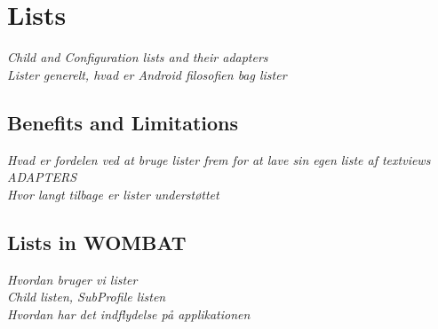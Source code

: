 \section{Lists}
\textit{Child and Configuration lists and their adapters\\
Lister generelt, hvad er Android filosofien bag lister}

\subsection{Benefits and Limitations}
\textit{ Hvad er fordelen ved at bruge lister frem for at lave sin egen liste af textviews\\
 ADAPTERS\\
 Hvor langt tilbage er lister understøttet\\}

\subsection{Lists in WOMBAT}
\textit{ Hvordan bruger vi lister\\
 Child listen, SubProfile listen\\
 Hvordan har det indflydelse på applikationen\\}